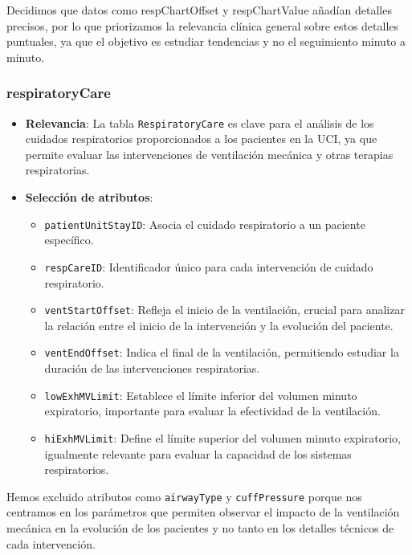 \documentclass[12pt, a4paper, twoside]{article}
\begin{document}
	Decidimos que datos como respChartOffset y respChartValue añadían detalles precisos, por lo que priorizamos la relevancia clínica general sobre estos detalles puntuales, ya que el objetivo es estudiar tendencias y no el seguimiento minuto a minuto.  \cite{eICU2024}
	
	\subsubsection{respiratoryCare}
	
	\begin{itemize}
		\item \textbf{Relevancia}: La tabla \texttt{RespiratoryCare} es clave para el análisis de los cuidados respiratorios proporcionados a los pacientes en la UCI, ya que permite evaluar las intervenciones de ventilación mecánica y otras terapias respiratorias.
		
		\item \textbf{Selección de atributos}:
		\begin{itemize}
			\item \texttt{patientUnitStayID}: Asocia el cuidado respiratorio a un paciente específico.
			\item \texttt{respCareID}: Identificador único para cada intervención de cuidado respiratorio.
			\item \texttt{ventStartOffset}: Refleja el inicio de la ventilación, crucial para analizar la relación entre el inicio de la intervención y la evolución del paciente.
			\item \texttt{ventEndOffset}: Indica el final de la ventilación, permitiendo estudiar la duración de las intervenciones respiratorias.
			\item \texttt{lowExhMVLimit}: Establece el límite inferior del volumen minuto expiratorio, importante para evaluar la efectividad de la ventilación.
			\item \texttt{hiExhMVLimit}: Define el límite superior del volumen minuto expiratorio, igualmente relevante para evaluar la capacidad de los sistemas respiratorios.
		\end{itemize}
		
	\end{itemize}
	
	Hemos excluido atributos como \texttt{airwayType} y \texttt{cuffPressure} porque nos centramos en los parámetros que permiten observar el impacto de la ventilación mecánica en la evolución de los pacientes y no tanto en los detalles técnicos de cada intervención.\cite{eICU2024}
	
\end{document}
